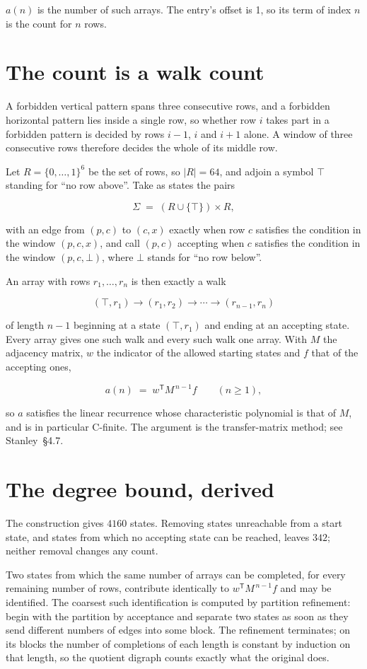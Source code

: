 \documentclass[11pt]{article}
\theoremstyle{definition}
\begin{document}
$a(n)$ is the number of such arrays. The entry's offset is 1, so its term of index $n$ is the count for $n$ rows.

\section{The count is a walk count}

A forbidden vertical pattern spans three consecutive rows, and a forbidden horizontal pattern lies inside a single row, so whether row $i$ takes part in a forbidden pattern is decided by rows $i-1$, $i$ and $i+1$ alone. A window of three consecutive rows therefore decides the whole of its middle row.

Let $R = \{0,\dots,1\}^{6}$ be the set of rows, so $|R| = 64$, and adjoin a symbol $\top$ standing for ``no row above''. Take as states the pairs

\[\Sigma \;=\; (R \cup \{\top\}) \times R,\]

with an edge from $(p,c)$ to $(c,x)$ exactly when row $c$ satisfies the condition in the window $(p,c,x)$, and call $(p,c)$ accepting when $c$ satisfies the condition in the window $(p,c,\bot)$, where $\bot$ stands for ``no row below''.

An array with rows $r_1,\dots,r_n$ is then exactly a walk

\[(\top,r_1) \to (r_1,r_2) \to \cdots \to (r_{n-1},r_n)\]

of length $n-1$ beginning at a state $(\top,r_1)$ and ending at an accepting state. Every array gives one such walk and every such walk one array. With $M$ the adjacency matrix, $w$ the indicator of the allowed starting states and $f$ that of the accepting ones,

\[a(n) \;=\; w^{\mathsf T} M^{\,n-1} f \qquad (n \ge 1),\]

so $a$ satisfies the linear recurrence whose characteristic polynomial is that of $M$, and is in particular C-finite. The argument is the transfer-matrix method; see Stanley~\S4.7.

\section{The degree bound, derived}

The construction gives $4160$ states. Removing states unreachable from a start state, and states from which no accepting state can be reached, leaves $342$; neither removal changes any count.

Two states from which the same number of arrays can be completed, for every remaining number of rows, contribute identically to $w^{\mathsf T}M^{\,n-1}f$ and may be identified. The coarsest such identification is computed by partition refinement: begin with the partition by acceptance and separate two states as soon as they send different numbers of edges into some block. The refinement terminates; on its blocks the number of completions of each length is constant by induction on that length, so the quotient digraph counts exactly what the original does.
\end{document}
